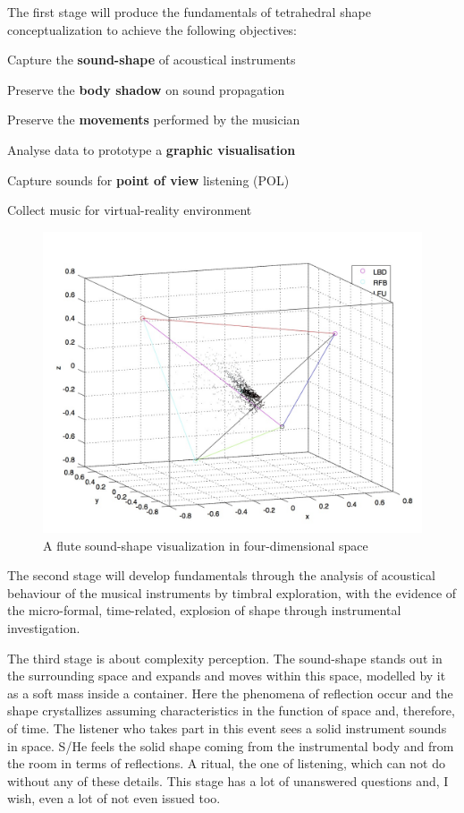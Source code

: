 \documentclass[
	a4paper,
	twocolumn
	]{article}
\begin{document}
The first stage will produce the fundamentals of tetrahedral shape conceptualization to achieve the following objectives:

\begin{compactitem}
\item Capture the \textbf{sound-shape} of acoustical instruments
\item Preserve the \textbf{body shadow} on sound propagation
\item Preserve the \textbf{movements} performed by the musician
\item Analyse data to prototype a \textbf{graphic visualisation}
\item Capture sounds for \textbf{point of view} listening (POL)
\item Collect music for virtual-reality environment
\end{compactitem}

\vfill\null

\begin{figure}[htbp]
\begin{center}
\includegraphics[width=.47\textwidth]{img/13230_1024_2.jpg}
\caption{A flute sound-shape visualization in four-dimensional space}
\label{shape}
\end{center}
\end{figure}

\newpage

The second stage will develop fundamentals through the analysis of acoustical behaviour of the musical instruments by timbral exploration, with the evidence of the micro-formal, time-related, explosion of shape through instrumental investigation.

The third stage is about complexity perception. The sound-shape stands out in the surrounding space and expands and moves within this space, modelled by it as a soft mass inside a container. Here the phenomena of reflection occur and the shape crystallizes assuming characteristics in the function of space and, therefore, of time. The listener who takes part in this event sees a solid instrument sounds in space. S/He feels the solid shape coming from the instrumental body and from the room in terms of reflections. A ritual, the one of listening, which can not do without any of these details. This stage has a lot of unanswered questions and, I wish, even a lot of not even issued too.
\end{document}

